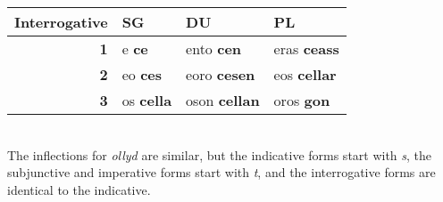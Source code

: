 \begin{center}
\begin{tabular}{|r|l|l|l|}
    \textbf{Interrogative} & \textbf{SG} & \textbf{DU} & \textbf{PL} \\ \hline
    \textbf{1} & e \textbf{ce} & ento \textbf{cen} & eras \textbf{ceass} \\ \hline
    \textbf{2} & eo \textbf{ces} & eoro \textbf{cesen} & eos \textbf{cellar} \\ \hline
    \textbf{3} & os \textbf{cella} & oson \textbf{cellan} & oros \textbf{gon} \\ \hline
  \end{tabular} \\
  The inflections for \emph{ollyd} are similar, but the indicative forms start with \emph{s}, the subjunctive and imperative forms start with \emph{t}, and the interrogative forms are identical to the indicative.
\end{center}